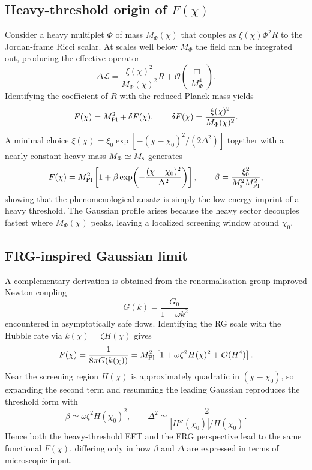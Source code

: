 \documentclass[11pt,a4paper]{article}
\begin{document}
\subsection{Heavy-threshold origin of $F(\chi)$}
Consider a heavy multiplet $\Phi$ of mass $M_{\Phi}(\chi)$ that couples as $\xi(\chi)\Phi^{2}R$ to the Jordan-frame Ricci scalar. At scales well below $M_{\Phi}$ the field can be integrated out, producing the effective operator
\begin{equation}
\Delta\mathcal{L}=\frac{\xi(\chi)^{2}}{M_{\Phi}(\chi)^{2}}R+\mathcal{O}\!\left(\frac{\Box}{M_{\Phi}^{4}}\right).
\end{equation}
Identifying the coefficient of $R$ with the reduced Planck mass yields
\begin{equation}
F(\chi)=M_{\rm Pl}^{2}+\delta F(\chi),\qquad \delta F(\chi)=\frac{\xi(\chi)^{2}}{M_{\Phi}(\chi)^{2}}.
\end{equation}
A minimal choice $\xi(\chi)=\xi_{0}\exp[-(\chi-\chi_{0})^{2}/(2\Delta^{2})]$ together with a nearly constant heavy mass $M_{\Phi}\simeq M_{\rm s}$ generates
\begin{equation}
F(\chi)=M_{\rm Pl}^{2}\left[1+\beta\exp\!\left(-\frac{(\chi-\chi_{0})^{2}}{\Delta^{2}}\right)\right], \qquad \beta=\frac{\xi_{0}^{2}}{M_{\rm s}^{2}M_{\rm Pl}^{2}},
\end{equation}
showing that the phenomenological ansatz is simply the low-energy imprint of a heavy threshold. The Gaussian profile arises because the heavy sector decouples fastest where $M_{\Phi}(\chi)$ peaks, leaving a localized screening window around $\chi_{0}$.

\subsection{FRG-inspired Gaussian limit}
A complementary derivation is obtained from the renormalisation-group improved Newton coupling
\begin{equation}
G(k)=\frac{G_{0}}{1+\omega k^{2}}
\end{equation}
encountered in asymptotically safe flows. Identifying the RG scale with the Hubble rate via $k(\chi)=\zeta H(\chi)$ gives
\begin{equation}
F(\chi)=\frac{1}{8\pi G(k(\chi))}=M_{\rm Pl}^{2}\left[1+\omega\zeta^{2}H(\chi)^{2}+ \mathcal{O}(H^{4})\right].
\end{equation}
Near the screening region $H(\chi)$ is approximately quadratic in $(\chi-\chi_{0})$, so expanding the second term and resumming the leading Gaussian reproduces the threshold form with
\begin{equation}
\beta\simeq \omega \zeta^{2} H(\chi_{0})^{2},\qquad \Delta^{2}\simeq \frac{2}{|H''(\chi_{0})|/H(\chi_{0})}.
\end{equation}
Hence both the heavy-threshold EFT and the FRG perspective lead to the same functional $F(\chi)$, differing only in how $\beta$ and $\Delta$ are expressed in terms of microscopic input.
\end{document}
